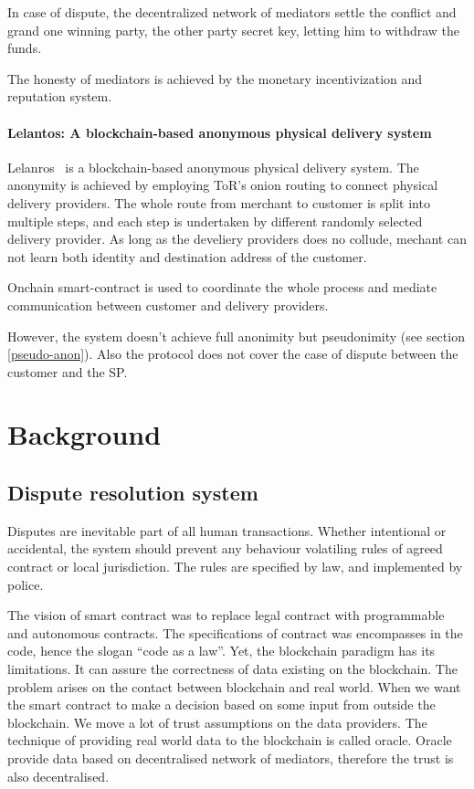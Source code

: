 \documentclass{ieeeaccess}
\begin{document}
In case of dispute, the decentralized network of mediators settle the
conflict and grand one winning party, the other party secret key,
letting him to withdraw the funds.

The honesty of mediators is achieved by the monetary incentivization and
reputation system.


\paragraph{Lelantos: A blockchain-based anonymous physical delivery
system}\label{lelantos-a-blockchain-based-anonymous-physical-delivery-system}

Lelanros~\cite{altawy2017lelantos} is a blockchain-based anonymous
physical delivery system. The anonymity is achieved by employing ToR's
onion routing to connect physical delivery providers. The whole route
from merchant to customer is split into multiple steps, and each step is
undertaken by different randomly selected delivery provider. As long as
the develiery providers does no collude, mechant can not learn both
identity and destination address of the customer.

Onchain smart-contract is used to coordinate the whole process and
mediate communication between customer and delivery providers.

However, the system doesn't achieve full anonimity but pseudonimity (see
section \ref{pseudo-anon}). Also the protocol does not
cover the case of dispute between the customer and the SP.

\section{Background}
\subsection{Dispute resolution system}

Disputes are inevitable part of all human transactions. Whether
intentional or accidental, the system should prevent any behaviour
volatiling rules of agreed contract or local jurisdiction. The rules are
specified by law, and implemented by police.

The vision of smart contract was to replace legal contract with
programmable and autonomous contracts. The specifications of contract
was encompasses in the code, hence the slogan ``code as a law''. Yet,
the blockchain paradigm has its limitations. It can assure the
correctness of data existing on the blockchain. The problem arises on
the contact between blockchain and real world. When we want the smart
contract to make a decision based on some input from outside the
blockchain. We move a lot of trust assumptions on the data providers.
The technique of providing real world data to the blockchain is called
oracle. Oracle provide data based on decentralised network of mediators,
therefore the trust is also decentralised.
\end{document}
